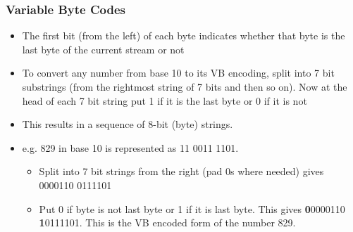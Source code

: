 \documentclass{article}
\begin{document}
\subsubsection{Variable Byte Codes}
\begin{itemize}
    \item The first bit (from the left) of each byte indicates whether that byte is the last byte of the current stream or not
    
    \item To convert any number from base 10 to its VB encoding, split into 7 bit substrings (from the rightmost string of 7 bits and then so on). Now at the head of each 7 bit string put 1 if it is the last byte or 0 if it is not
    
    \item This results in a sequence of 8-bit (byte) strings. 
    
    \item e.g. 829 in base 10 is represented as 11 0011 1101. 
    \begin{itemize}
        \item Split into 7 bit strings from the right (pad 0s where needed) gives 0000110 0111101
        
        \item Put 0 if byte is not last byte or 1 if it is last byte. This gives \textbf{0}0000110 \textbf{1}0111101. This is the VB encoded form of the number 829. 
    \end{itemize}
\end{itemize}
\end{document}
